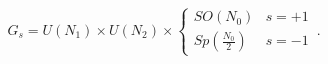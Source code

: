 \begin{equation}
G_s = U(N_1)\times U(N_2) \times \left\{ \begin{array}{cc} SO(N_0) & s=+1 \\
Sp(\frac{N_0}{2}) & s=-1
\end{array}\right.\,.
\end{equation}

